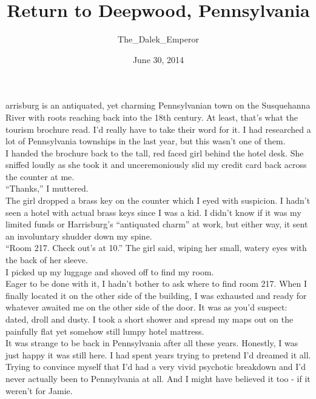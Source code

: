 \documentclass[a5paper]{scrartcl}
\title{Return to Deepwood, Pennsylvania}
\author{The\_Dalek\_Emperor}
\date{June 30, 2014}
\begin{document}
\maketitle

arrisburg is an antiquated, yet charming Pennsylvanian town on the Susquehanna River with roots reaching back into the 18th century. At least, that's what the tourism brochure read. I'd really have to take their word for it.  I had researched a lot of Pennsylvania townships in the last year, but this wasn't one of them.\\


I handed the brochure back to the tall, red faced girl behind the hotel desk. She sniffed loudly as she took it and unceremoniously slid my credit card back across the counter at me.\\


\enquote{Thanks,} I muttered.\\


The girl dropped a brass key on the counter which I eyed with suspicion. I hadn't seen a hotel with actual brass keys since I was a kid. I didn't know if it was my limited funds or Harrisburg's \enquote{antiquated charm} at work, but either way, it sent an involuntary shudder down my spine.\\


\enquote{Room 217. Check out's at 10.} The girl said, wiping her small, watery eyes with the back of her sleeve.\\


I picked up my luggage and shoved off to find my room. \\


Eager to be done with it, I hadn't bother to ask where to find room 217. When I finally located it on the other side of the building, I was exhausted and ready for whatever awaited me on the other side of the door. It was as you'd suspect: dated, droll and dusty. I took a short shower and spread my maps out on the painfully flat yet somehow still lumpy hotel mattress.\\


It was strange to be back in Pennsylvania after all these years. Honestly, I was just happy it was still here. I had spent years trying to pretend I'd dreamed it all. Trying to convince myself that I'd had a very vivid psychotic breakdown and I'd never actually been to Pennsylvania at all. And I might have believed it too - if it weren't for Jamie.\\
\end{document}

